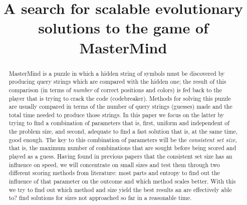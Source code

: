 \documentclass[conference]{IEEEtran}
\begin{document}
%
\title{A search for scalable evolutionary solutions to the game of MasterMind}

\author{
\and
{}
\and
{}
}

\maketitle

\begin{abstract}
MasterMind is a puzzle in which a hidden string of symbols must be
discovered by producing query strings which are compared with the
hidden one; the result of this comparison (in terms of {\em number}
of correct positions and colors) is fed back to the
player that is trying to crack the code (codebreaker).
Methods for solving this puzzle 
are usually compared in terms of the number of query strings (guesses) made and the total time needed to produce those strings. In this paper we focus on the latter by trying 
to find a combination of parameters that is, first, uniform and
independent of the problem size, and second, adequate to find a fast
solution that is, at the same time, good enough. The key to this combination of parameters
will be the {\em consistent set size}, that is, the maximum number of
combinations that are sought before being scored and played as a
guess. Having found in previous papers that the consistent set size has an influence
on speed, we will concentrate on small sizes and test them through two
different scoring methods from literature: most parts and entropy
to find out the influence of that parameter on the outcome and which
method scales better.  With this we try to find out which method and
size yield the best results an are effectively able to? find solutions
for sizes not approached so far in a reasonable time. 
\end{abstract}
\end{document}
